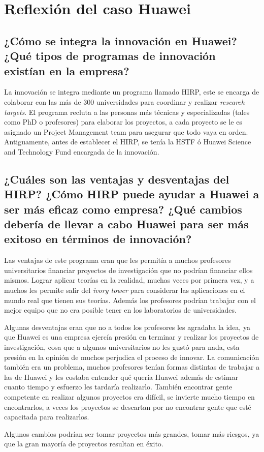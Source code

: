 \documentclass{article}
\begin{document}
\section{Reflexión del caso Huawei}


\subsection{¿Cómo se integra la innovación en Huawei? ¿Qué tipos de programas de innovación existían en la empresa?}
La innovación se integra mediante un programa llamado HIRP, este se encarga de colaborar con las más de 300 universidades para coordinar y realizar \emph{research targets}. El programa recluta a las personas más técnicas y especializadas (tales como PhD o profesores) para elaborar los proyectos, a cada proyecto se le es asignado un Project Management team para asegurar que todo vaya en orden. Antiguamente, antes de establecer el HIRP, se tenía la HSTF ó Huawei Science and Technology Fund encargada de la innovación.

\subsection{¿Cuáles son las ventajas y desventajas del HIRP? ¿Cómo HIRP puede ayudar a Huawei a ser más eficaz como empresa? ¿Qué cambios debería de llevar a cabo Huawei para ser más exitoso en términos de innovación?  }
Las ventajas de este programa eran que les permitía a muchos profesores universitarios financiar proyectos de investigación que no podrían financiar ellos mismos. Lograr aplicar teorías en la realidad, muchas veces por primera vez, y a muchos les permite salir del \emph{ivory tower} para considerar las aplicaciones en el mundo real que tienen sus teorías. Además los profesores podrían trabajar con el mejor equipo que no era posible tener en los laboratorios de universidades. \par
Algunas desventajas eran que no a todos los profesores les agradaba la idea, ya que Huawei es una empresa ejercía presión en terminar y realizar los proyectos de investigación, cosa que a algunos universitarios no les gustó para nada, esta presión en la opinión de muchos perjudica el proceso de innovar. La comunicación también era un problema, muchos profesores tenían formas distintas de trabajar a las de Huawei y les costaba entender qué quería Huawei además de estimar cuanto tiempo y esfuerzo les tardaría realizarlo. También encontrar gente competente en realizar algunos proyectos era difícil, se invierte mucho tiempo en encontrarlos, a veces los proyectos se descartan por no encontrar gente que esté capacitada para realizarlos. \par
Algunos cambios podrían ser tomar proyectos más grandes, tomar más riesgos, ya que la gran mayoría de proyectos resultan en éxito. 
\end{document}

